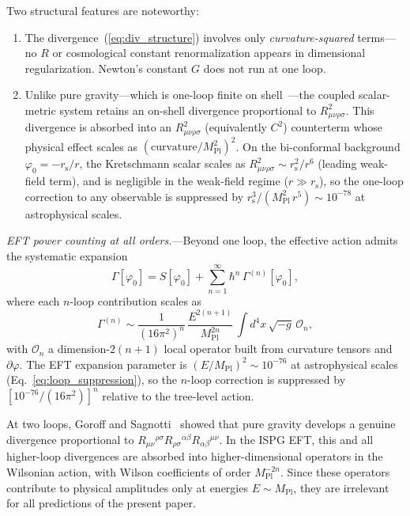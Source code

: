 \documentclass[aps,prd,onecolumn,superscriptaddress,nofootinbib,showpacs,12pt,notitlepage]{revtex4-2}
\newcommand{\Mpl}{M_{\mathrm{Pl}}}
\newcommand{\rs}{r_{\mathrm{s}}}
\begin{document}
Two structural features are noteworthy:
\begin{enumerate}
\item The divergence~(\ref{eq:div_structure}) involves
  only \emph{curvature-squared} terms---no $R$ or
  cosmological constant renormalization appears in
  dimensional regularization.  Newton's constant $G$ does
  not run at one loop.
\item Unlike pure gravity---which is one-loop finite on
  shell~\cite{tHooftVeltman1974}---the coupled
  scalar-metric system retains an on-shell divergence
  proportional to $R_{\mu\nu\rho\sigma}^2$.  This
  divergence is absorbed into an $R_{\mu\nu\rho\sigma}^2$
  (equivalently $C^2$) counterterm whose
  physical effect scales as
  $(\mathrm{curvature}/\Mpl^2)^2$.  On the bi-conformal
  background $\varphi_0 = -\rs/r$, the Kretschmann scalar
  scales as $R_{\mu\nu\rho\sigma}^2 \sim \rs^{2}/r^{6}$
  (leading weak-field term), and is
  negligible in the weak-field regime ($r \gg \rs$), so the
  one-loop correction to any observable is suppressed by
  $\rs^3/(\Mpl^2\,r^5) \sim 10^{-78}$ at astrophysical
  scales.
\end{enumerate}

\textit{EFT power counting at all orders.}---Beyond one
loop, the effective action admits the systematic expansion
\begin{equation}\label{eq:EFT_expansion}
  \Gamma[\varphi_0]
  = S[\varphi_0]
    + \sum_{n=1}^{\infty}
      \hbar^n\,\Gamma^{(n)}[\varphi_0],
\end{equation}
where each $n$-loop contribution scales as
\begin{equation}\label{eq:n_loop_scaling}
  \Gamma^{(n)} \sim
  \frac{1}{(16\pi^2)^n}\,
  \frac{E^{2(n+1)}}{\Mpl^{2n}}\,
  \int d^4x\,\sqrt{-g}\,\mathcal{O}_n,
\end{equation}
with $\mathcal{O}_n$ a dimension-$2(n+1)$ local operator
built from curvature tensors and $\partial\varphi$.  The
EFT expansion parameter is
$(E/\Mpl)^2 \sim 10^{-76}$ at astrophysical scales
(Eq.~\ref{eq:loop_suppression}), so the $n$-loop
correction is suppressed by $[10^{-76}/(16\pi^2)]^n$
relative to the tree-level action.

At two loops, Goroff and Sagnotti~\cite{GoroffSagnotti1986}
showed that pure gravity develops a genuine divergence
proportional to $R_{\mu\nu}{}^{\rho\sigma}
R_{\rho\sigma}{}^{\alpha\beta}R_{\alpha\beta}{}^{\mu\nu}$.
In the ISPG EFT, this and all higher-loop divergences are
absorbed into higher-dimensional operators in the
Wilsonian action, with Wilson coefficients of order
$\Mpl^{-2n}$.  Since these operators contribute to
physical amplitudes only at energies $E \sim \Mpl$, they
are irrelevant for all predictions of the present paper.
\end{document}
